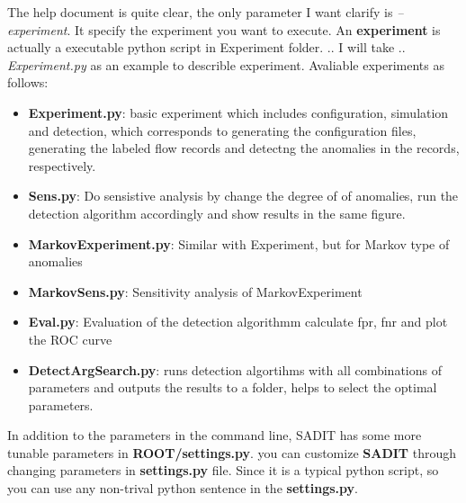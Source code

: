 \documentclass[letterpaper,10pt,english]{sphinxmanual}
\begin{document}
\begin{description}
\end{description}

The help document is quite clear, the only parameter I want clarify is
\emph{--experiment}. It specify the experiment you want to execute. An \textbf{experiment}
is actually a executable python script in Experiment folder.
..  I will take
..  \emph{Experiment.py} as an example to describle experiment.
Avaliable experiments as follows:
\begin{itemize}
\item {} 
\textbf{Experiment.py}: basic experiment which includes configuration,
simulation and detection, which corresponds to generating the
configuration files, generating the labeled flow records and detectng the
anomalies in the records, respectively.

\item {} 
\textbf{Sens.py}: Do sensistive analysis by change the degree of of anomalies,
run the detection algorithm accordingly and show results in the same
figure.

\item {} 
\textbf{MarkovExperiment.py}: Similar with Experiment, but for Markov type of
anomalies

\item {} 
\textbf{MarkovSens.py}: Sensitivity analysis of MarkovExperiment

\item {} 
\textbf{Eval.py}: Evaluation of the detection algorithmm calculate fpr, fnr and
plot the ROC curve

\item {} 
\textbf{DetectArgSearch.py}: runs detection algortihms with all combinations of
parameters and outputs the results to a folder, helps to select the
optimal parameters.

\end{itemize}

In addition to the parameters in the command line, SADIT has some more tunable
parameters in \textbf{ROOT/settings.py}. you can customize \textbf{SADIT} through changing
parameters in \textbf{settings.py} file. Since it is a typical python script, so you can
use any non-trival python sentence in the \textbf{settings.py}.
\end{document}
